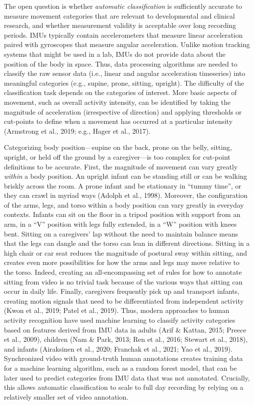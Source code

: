 \documentclass[
  man]{apa6}
\begin{document}
The open question is whether \emph{automatic classification} is sufficiently accurate to measure movement categories that are relevant to developmental and clinical research, and whether measurement validity is acceptable over long recording periods. IMUs typically contain accelerometers that measure linear acceleration paired with gyroscopes that measure angular acceleration. Unlike motion tracking systems that might be used in a lab, IMUs do not provide data about the position of the body in space. Thus, data processing algorithms are needed to classify the raw sensor data (i.e., linear and angular acceleration timeseries) into meaningful categories (e.g., supine, prone, sitting, upright). The difficulty of the classification task depends on the categories of interest. More basic aspects of movement, such as overall activity intensity, can be identified by taking the magnitude of acceleration (irrespective of direction) and applying thresholds or cut-points to define when a movement has occurred at a particular intensity (Armstrong et al., 2019; e.g., Hager et al., 2017).

Categorizing body position---supine on the back, prone on the belly, sitting, upright, or held off the ground by a caregiver---is too complex for cut-point definitions to be accurate. First, the magnitude of movement can vary greatly \emph{within} a body position. An upright infant can be standing still or can be walking briskly across the room. A prone infant and be stationary in ``tummy time'', or they can crawl in myriad ways (Adolph et al., 1998). Moreover, the configuration of the arms, legs, and torso within a body position can vary greatly in everyday contexts. Infants can sit on the floor in a tripod position with support from an arm, in a ``V'' position with legs fully extended, in a ``W'' position with knees bent. Sitting on a caregivers' lap without the need to maintain balance means that the legs can dangle and the torso can lean in different directions. Sitting in a high chair or car seat reduces the magnitude of postural sway within sitting, and creates even more possibilities for how the arms and legs may move relative to the torso. Indeed, creating an all-encompassing set of rules for how to annotate sitting from video is no trivial task because of the various ways that sitting can occur in daily life. Finally, caregivers frequently pick up and transport infants, creating motion signals that need to be differentiated from independent activity (Kwon et al., 2019; Patel et al., 2019). Thus, modern approaches to human activity recognition have used machine learning to classify activity categories based on features derived from IMU data in adults (Arif \& Kattan, 2015; Preece et al., 2009), children (Nam \& Park, 2013; Ren et al., 2016; Stewart et al., 2018), and infants (Airaksinen et al., 2020; Franchak et al., 2021; Yao et al., 2019). Synchronized video with ground-truth human annotations creates training data for a machine learning algorithm, such as a random forest model, that can be later used to predict categories from IMU data that was not annotated. Crucially, this allows automatic classification to scale to full day recording by relying on a relatively smaller set of video annotation.
\end{document}
